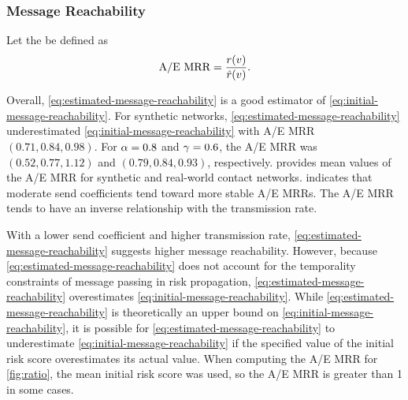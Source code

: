 \subsubsection{Message Reachability}

Let the  be defined as
\begin{equation*}
  \text{A/E MRR} = \frac{r(v)}{\hat{r}(v)}.
\end{equation*}

Overall, \cref{eq:estimated-message-reachability} is a good estimator of \cref{eq:initial-message-reachability}. For synthetic networks, \cref{eq:estimated-message-reachability} underestimated \cref{eq:initial-message-reachability} with A/E MRR $(\num{0.71}, \num{0.84}, \num{0.98})$. For $\alpha = \num{0.8}$ and $\gamma = \num{0.6}$, the A/E MRR was $(\num{0.52}, \num{0.77}, \num{1.12})$ and $(\num{0.79}, \num{0.84}, \num{0.93})$, respectively.  provides mean values of the A/E MRR for synthetic and real-world contact networks.  indicates that moderate send coefficients tend toward more stable A/E MRRs. The A/E MRR tends to have an inverse relationship with the transmission rate.

With a lower send coefficient and higher transmission rate, \cref{eq:estimated-message-reachability} suggests higher message reachability. However, because \cref{eq:estimated-message-reachability} does not account for the temporality constraints of message passing in risk propagation, \cref{eq:estimated-message-reachability} overestimates \cref{eq:initial-message-reachability}. While \cref{eq:estimated-message-reachability} is theoretically an upper bound on \cref{eq:initial-message-reachability}, it is possible for \cref{eq:estimated-message-reachability} to underestimate \cref{eq:initial-message-reachability} if the specified value of the initial risk score overestimates its actual value. When computing the A/E MRR for \cref{fig:ratio}, the mean initial risk score was used, so the A/E MRR is greater than \num{1} in some cases.

